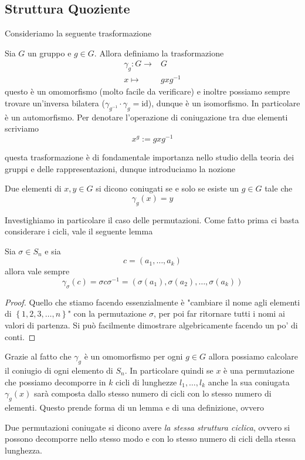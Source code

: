 \documentclass[11pt]{scrartcl}
\begin{document}
	\subsection{Struttura Quoziente}
	Consideriamo la seguente trasformazione
	\begin{definition}[Coniugio]
		Sia $G$ un gruppo e $g\in G$. Allora definiamo la trasformazione
		\begin{align*}
			\gamma_g:G\to & G \\
			x \mapsto & gxg^{-1}
		\end{align*}
		questo è un omomorfismo (molto facile da verificare) e inoltre possiamo sempre trovare un'inversa bilatera ($\gamma_{g^{-1}}\cdot \gamma_g=\text{id}$), dunque è un isomorfismo. In particolare è un automorfismo. Per denotare l'operazione di coniugazione tra due elementi scriviamo
		$$x^g:=gxg^{-1}$$
	\end{definition}
	questa trasformazione è di fondamentale importanza nello studio della teoria dei gruppi e delle rappresentazioni, dunque introduciamo la nozione
	\begin{definition}
		Due elementi di $x,y\in G$ si dicono coniugati se e solo se esiste un $g\in G$ tale che
		$$\gamma_g(x)=y$$
	\end{definition}
	Investighiamo in particolare il caso delle permutazioni. Come fatto prima ci basta considerare i cicli, vale il seguente lemma
	\begin{lemma}
		Sia $\sigma\in S_n$ e sia 
		$$c=(a_1,\dots,a_k)$$
		allora vale sempre
		$$\gamma_\sigma(c)=\sigma c \sigma^{-1}=\left(\sigma(a_1),\sigma(a_2),\dots,\sigma(a_k)\right)$$
	\end{lemma}
	\begin{proof}
		Quello che stiamo facendo essenzialmente è "cambiare il nome agli elementi di $\left\{1,2,3,\dots,n\right\}$" con la permutazione $\sigma$, per poi far ritornare tutti i nomi ai valori di partenza. Si può facilmente dimostrare algebricamente facendo un po' di conti.
	\end{proof}
	Grazie al fatto che $\gamma_g$ è un omomorfismo per ogni $g\in G$ allora possiamo calcolare il coniugio di ogni elemento di $S_n$. In particolare quindi se $x$ è una permutazione che possiamo decomporre in $k$ cicli di lunghezze $l_1,\dots,l_k$ anche la sua coniugata $\gamma_g(x)$ sarà composta dallo stesso numero di cicli con lo stesso numero di elementi. Questo prende forma di un lemma e di una definizione, ovvero
	\begin{lemma}
		Due permutazioni coniugate si dicono avere \textit{la stessa struttura ciclica}, ovvero si possono decomporre nello stesso modo e con lo stesso numero di cicli della stessa lunghezza.
	\end{lemma} 
\end{document}
